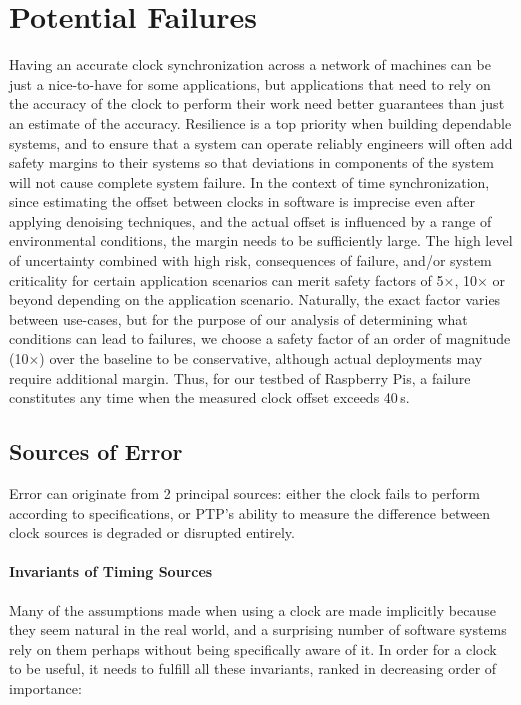 
\section{Potential Failures}

Having an accurate clock synchronization across a network of machines can be just a nice-to-have for some applications, but applications that need to rely on the accuracy of the clock to perform their work need better guarantees than just an estimate of the accuracy.
Resilience is a top priority when building dependable systems, and to ensure that a system can operate reliably engineers will often add safety margins to their systems so that deviations in components of the system will not cause complete system failure.
In the context of time synchronization, since estimating the offset between clocks in software is imprecise even after applying denoising techniques, and the actual offset is influenced by a range of environmental conditions, the margin needs to be sufficiently large.
The high level of uncertainty combined with high risk, consequences of failure, and/or system criticality for certain application scenarios can merit safety factors of 5$\times$, 10$\times$ or beyond depending on the application scenario.
Naturally, the exact factor varies between use-cases, but for the purpose of our analysis of determining what conditions can lead to failures, we choose a safety factor of an order of magnitude (10$\times$) over the baseline to be conservative, although actual deployments may require additional margin.
Thus, for our testbed of Raspberry Pis, a failure constitutes any time when the measured clock offset exceeds 40\,\textmu{}s.

\subsection{Sources of Error}

Error can originate from 2 principal sources: either the clock fails to perform according to specifications, or PTP's ability to measure the difference between clock sources is degraded or disrupted entirely.

\paragraph*{Invariants of Timing Sources} Many of the assumptions made when using a clock are made implicitly because they seem natural in the real world, and a surprising number of software systems rely on them perhaps without being specifically aware of it. In order for a clock to be useful, it needs to fulfill all these invariants, ranked in decreasing order of importance:

